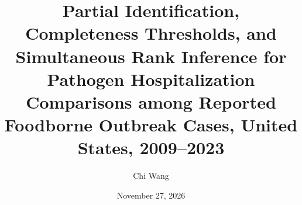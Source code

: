 \documentclass[11pt,a4paper]{article}
\title{\textbf{Partial Identification, Completeness Thresholds, and Simultaneous Rank Inference for Pathogen Hospitalization Comparisons among Reported Foodborne Outbreak Cases, United States, 2009--2023}}
\author{Chi Wang}
\date{November 27, 2026}
\begin{document}
\maketitle
\normalfont\mdseries






\clearpage


\FloatBarrier
\clearpage
{\small


}
\end{document}

